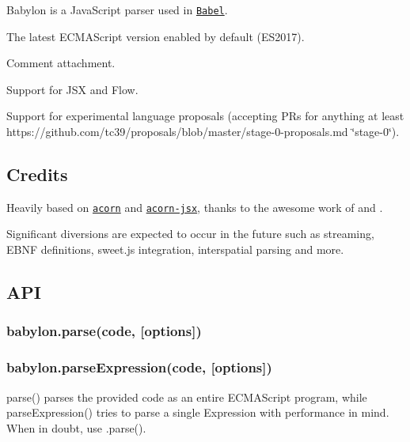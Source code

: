  

Babylon is a Java\+Script parser used in \href{https://github.com/babel/babel}{\tt Babel}. 

\href{https://travis-ci.org/babel/babylon}{\tt } \href{https://codecov.io/gh/babel/babylon}{\tt } 


\begin{DoxyItemize}
\item The latest E\+C\+M\+A\+Script version enabled by default (E\+S2017).
\item Comment attachment.
\item Support for J\+SX and Flow.
\item Support for experimental language proposals (accepting P\+Rs for anything at least https\+://github.com/tc39/proposals/blob/master/stage-\/0-\/proposals.\+md \char`\"{}stage-\/0\char`\"{}).
\end{DoxyItemize}

\subsection*{Credits}

Heavily based on \href{https://github.com/marijnh/acorn}{\tt acorn} and \href{https://github.com/RReverser/acorn-jsx}{\tt acorn-\/jsx}, thanks to the awesome work of \href{https://github.com/RReverser}{\tt } and \href{https://github.com/marijnh}{\tt }.

Significant diversions are expected to occur in the future such as streaming, E\+B\+NF definitions, sweet.\+js integration, interspatial parsing and more.

\subsection*{A\+PI}

\subsubsection*{{\ttfamily babylon.\+parse(code, \mbox{[}options\mbox{]})}}

\subsubsection*{{\ttfamily babylon.\+parse\+Expression(code, \mbox{[}options\mbox{]})}}

{\ttfamily parse()} parses the provided {\ttfamily code} as an entire E\+C\+M\+A\+Script program, while {\ttfamily parse\+Expression()} tries to parse a single Expression with performance in mind. When in doubt, use {\ttfamily .parse()}.

